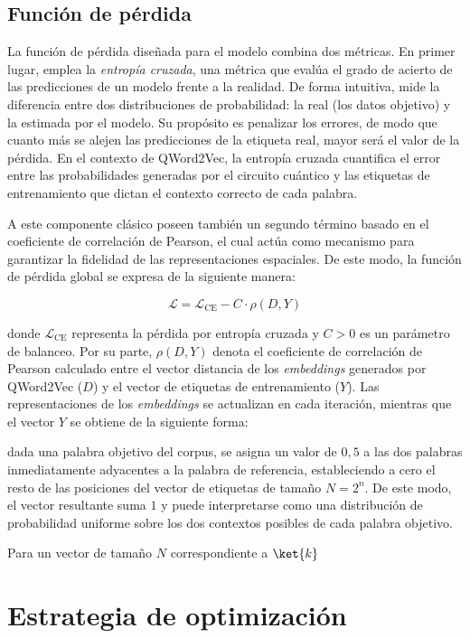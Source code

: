 \subsection{Función de pérdida}

La función de pérdida diseñada para el modelo combina dos métricas. En primer lugar, emplea la \textit{entropía cruzada}, una métrica que evalúa el grado de acierto de las predicciones de un modelo frente a la realidad. De forma intuitiva, mide la diferencia entre dos distribuciones de probabilidad: la real (los datos objetivo) y la estimada por el modelo. Su propósito es penalizar los errores, de modo que cuanto más se alejen las predicciones de la etiqueta real, mayor será el valor de la pérdida. En el contexto de QWord2Vec, la entropía cruzada cuantifica el error entre las probabilidades generadas por el circuito cuántico y las etiquetas de entrenamiento que dictan el contexto correcto de cada palabra.

A este componente clásico poseen también un segundo término basado en el coeficiente de correlación de Pearson, el cual actúa como mecanismo para garantizar la fidelidad de las representaciones espaciales. De este modo, la función de pérdida global se expresa de la siguiente manera:

\[
  \mathcal{L} = \mathcal{L}_{\text{CE}} - C \cdot \rho(D, Y)
\]

donde $\mathcal{L}_{\text{CE}}$ representa la pérdida por entropía cruzada y $C > 0$ es un parámetro de balanceo. Por su parte, $\rho(D, Y)$ denota el coeficiente de correlación de Pearson calculado entre el vector distancia de los \textit{embeddings} generados por QWord2Vec ($D$) y el vector de etiquetas de entrenamiento ($Y$). Las representaciones de los \textit{embeddings} se actualizan en cada iteración, mientras que el vector $Y$ se obtiene de la siguiente forma:

dada una palabra objetivo del corpus, se asigna un valor de $0{,}5$ a las dos palabras inmediatamente adyacentes a la palabra de referencia, estableciendo a cero el resto de las posiciones del vector de etiquetas de tamaño $N = 2^n$. De este modo, el vector resultante suma $1$ y puede interpretarse como una distribución de probabilidad uniforme sobre los dos contextos posibles de cada palabra objetivo.

Para un vector de tamaño $N$ correspondiente a $\ket{k}$


\section{Estrategia de optimización}

